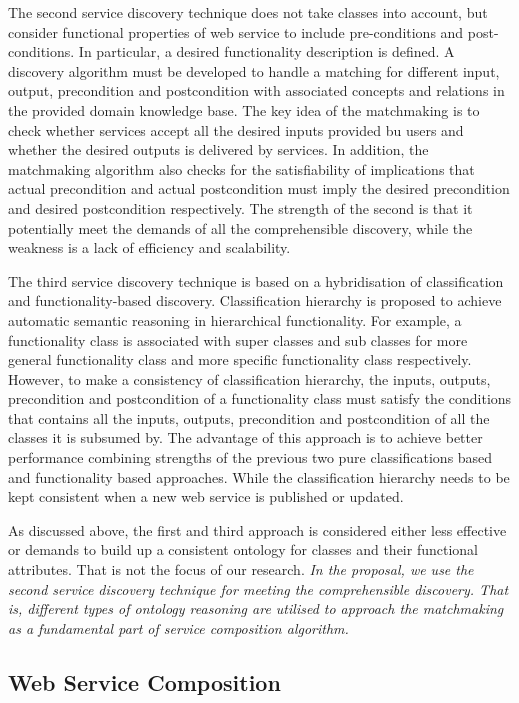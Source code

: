 The second service discovery technique  does not take classes into account, but consider functional properties of web service to include pre-conditions and post-conditions. In particular, a desired functionality description is defined. A discovery algorithm must be developed to handle a matching for different input, output, precondition and postcondition with associated concepts and relations in the provided domain knowledge base. The key idea of the matchmaking is to check whether services accept all the desired inputs provided bu users and whether the desired outputs is delivered by services. In addition, the matchmaking algorithm also checks for the satisfiability of implications that actual precondition and actual postcondition must imply the desired precondition and desired postcondition respectively. The strength of the second is that it potentially meet the demands of all the comprehensible discovery, while the weakness is a lack of efficiency and scalability. 

The third service discovery technique is based on a hybridisation of classification and functionality-based discovery. Classification hierarchy is proposed to achieve automatic semantic reasoning in hierarchical functionality. For example, a functionality class is associated with super classes and sub classes for more general functionality class and more specific functionality class respectively. However, to make a consistency of classification hierarchy, the inputs, outputs, precondition and postcondition of a functionality class must satisfy the conditions that contains all the inputs, outputs, precondition and postcondition of all the classes it is subsumed by. The advantage of this approach is to achieve better performance combining strengths of the previous two pure classifications based and functionality based approaches. While the classification hierarchy needs to be kept consistent when a new web service is published or updated.​

As discussed above, the first and third approach is considered either less effective or demands to build up a consistent ontology for classes and their functional attributes. That is not the focus of our research.  \emph{In the proposal, we use the second service discovery technique for meeting the comprehensible discovery. That is, different types of ontology reasoning are utilised to approach the matchmaking as a fundamental part of service composition algorithm.}



\subsection{Web Service Composition}\label{servicecomposition}

